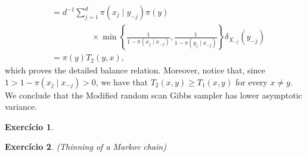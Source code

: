 \documentclass[a4paper,12pt]{article}
\newtheorem{exercise}{Exercício}
\theoremstyle{definition}
\begin{document}
\begin{enumerate}
\begin{equation*}
\begin{split}
            &= d^{-1}\sum_{j=1}^d \pi(x_j\mid y_{-j})\pi(y)  \\
            &\hspace{2cm}\times\min\left\{\frac{1}{1-\pi(x_j \mid x_{-j})}, \frac{1}{1-\pi(y_j\mid x_{-j})}\right\}\delta_{X_{-j}}(y_{-j}) \\
            &= \pi(y)T_2(y,x),
        \end{split}
    \end{equation*}
    which proves the detailed balance relation. Moreover, notice that, since
    $1 > 1 - \pi(x_j \mid x_{-j}) > 0$, we have that $T_2(x,y) \ge T_1(x,y)$
    for every $x \neq y$. We conclude that the Modified random scan Gibbs
    sampler has lower asymptotic variance. 
\end{enumerate}

\begin{exercise}
\end{exercise}

\begin{exercise}
    (Thinning of a Markov chain)
\end{exercise}
\end{document}
